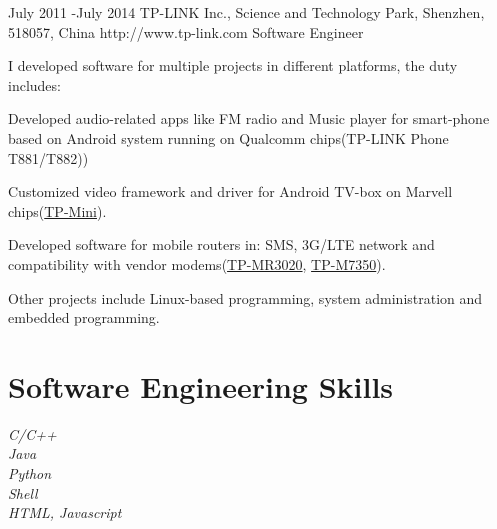 \documentclass[10pt]{article} %
\begin{document}
\job
{July 2011 -}{July 2014}
{TP-LINK Inc., Science and Technology Park, Shenzhen, 518057, China}
{http://www.tp-link.com}
{Software Engineer}
{I developed software for multiple projects in different platforms, the duty includes:

\begin{itemize-noindent}
\item{Developed audio-related apps like FM radio and Music player for smart-phone based on Android system running on Qualcomm chips(TP-LINK Phone T881/T882))}
\item{Customized video framework and driver for Android TV-box on Marvell chips(\href{http://www.amazon.com/TP-LINK-Android-Built-Support-Playing/dp/B00CRVHIPK}{TP-Mini}).}
\item{Developed software for mobile routers in: SMS, 3G/LTE network and compatibility with vendor modems(\href{http://www.amazon.com/TP-LINK-TL-MR3020-Wireless-Portable-Router/dp/B00634PLTW/ref=sr_1_1?s=electronics&ie=UTF8&qid=1438745356&sr=1-1&keywords=MR3020}{TP-MR3020},  \href{http://www.amazon.com/TP-Link-M7350-LTE-WLAN-routeur/dp/B00PIBBWSK/ref=sr_1_5?s=electronics&ie=UTF8&qid=1438745627&sr=1-5&keywords=M7350}{TP-M7350}).}
\end{itemize-noindent}

Other projects include Linux-based programming, system administration and embedded programming.}


\section{Software Engineering Skills}

{
\textit{C/C++}\\
\textit{Java}\\
\textit{Python}\\
\textit{Shell}\\
\textit{HTML, Javascript}\\
}


\end{document}
